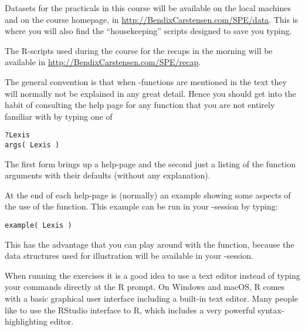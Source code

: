  Datasets for the practicals in this course will be available on the
 local machines and on the course homepage, in
 \url{http://BendixCarstensen.com/SPE/data}. This is where you will
 also find the ``housekeeping'' scripts designed to save you typing.

 The R-scripts used during the course for the recaps in the morning
 will be available in \url{http://BendixCarstensen.com/SPE/recap}.

 The general convention is that when \R-functions are mentioned in the
 text they will normally not be explained in any great detail. Hence
 you should get into the habit of consulting the help page for any
 function that you are not entirely familiar with by typing one of
\begin{verbatim}
?Lexis
args( Lexis )
\end{verbatim}
The first form brings up a help-page and the second just a listing of
the function arguments with their defaults (without any explanation).

At the end of each help-page is (normally) an example showing some
aspects of the use of the function. This example can be run in your
\R-session by typing:
\begin{verbatim}
example( Lexis )
\end{verbatim}
This has the advantage that you can play around with the function,
because the data structures used for illustration will be available in
your \R-session.

When running the exercises it is a good idea to use a text editor
instead of typing your commands directly at the R prompt. On Windows
and macOS, R comes with a basic graphical user interface including a
built-in text editor. Many people like to use the RStudio interface to
R, which includes a very powerful syntax-highlighting editor.

